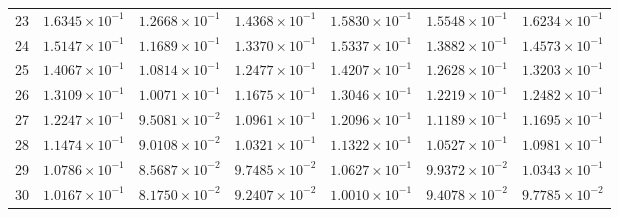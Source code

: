 \begin{table}[H]
\begin{tabular}{@{}rrrrrrr@{}}
23 & $1.6345\times10^{-1}$ & $1.2668\times10^{-1}$ & $1.4368\times10^{-1}$ & $1.5830\times10^{-1}$ & $1.5548\times10^{-1}$ & $1.6234\times10^{-1}$\\
24 & $1.5147\times10^{-1}$ & $1.1689\times10^{-1}$ & $1.3370\times10^{-1}$ & $1.5337\times10^{-1}$ & $1.3882\times10^{-1}$ & $1.4573\times10^{-1}$\\
25 & $1.4067\times10^{-1}$ & $1.0814\times10^{-1}$ & $1.2477\times10^{-1}$ & $1.4207\times10^{-1}$ & $1.2628\times10^{-1}$ & $1.3203\times10^{-1}$\\
26 & $1.3109\times10^{-1}$ & $1.0071\times10^{-1}$ & $1.1675\times10^{-1}$ & $1.3046\times10^{-1}$ & $1.2219\times10^{-1}$ & $1.2482\times10^{-1}$\\
27 & $1.2247\times10^{-1}$ & $9.5081\times10^{-2}$ & $1.0961\times10^{-1}$ & $1.2096\times10^{-1}$ & $1.1189\times10^{-1}$ & $1.1695\times10^{-1}$\\
28 & $1.1474\times10^{-1}$ & $9.0108\times10^{-2}$ & $1.0321\times10^{-1}$ & $1.1322\times10^{-1}$ & $1.0527\times10^{-1}$ & $1.0981\times10^{-1}$\\
29 & $1.0786\times10^{-1}$ & $8.5687\times10^{-2}$ & $9.7485\times10^{-2}$ & $1.0627\times10^{-1}$ & $9.9372\times10^{-2}$ & $1.0343\times10^{-1}$\\
30 & $1.0167\times10^{-1}$ & $8.1750\times10^{-2}$ & $9.2407\times10^{-2}$ & $1.0010\times10^{-1}$ & $9.4078\times10^{-2}$ & $9.7785\times10^{-2}$\\
\bottomrule
\end{tabular}
\end{table}

